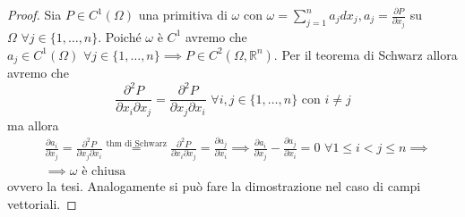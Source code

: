 \begin{proof}
Sia $P \in C^1(\Omega)$ una primitiva di $\omega$ con $\omega = \sum\limits_{j=1}^n a_j dx_j, a_j = \frac{\partial P}{\partial x_j}$ su $\Omega \, \, \forall j \in \{1, \ldots, n \}$. Poiché
$\omega$ è $C^1$ avremo che $a_j \in C^1(\Omega) \, \, \forall j \in \{1, \ldots, n \} \implies P \in C^2(\Omega, \mathbb{R}^n)$. Per il teorema di Schwarz allora avremo che
$$
\frac{\partial^2 P}{\partial x_i \partial x_j} = \frac{\partial^2 P}{\partial x_j \partial x_i} \, \, \forall i, j \in \{1, \ldots, n \} \text{ con } i \neq j
$$
ma allora
\begin{align*}
&\frac{\partial a_i}{\partial x_j} = \frac{\partial^2 P}{\partial x_j \partial x_i} \stackrel{\text{thm di Schwarz}}{=} \frac{\partial^2 P}{\partial x_i \partial x_j} = \frac{\partial a_j}{\partial x_i} \implies \frac{\partial a_i}{\partial x_j} - \frac{\partial a_j}{\partial x_i} = 0 \, \, \forall 1 \leq i < j \leq n \implies \\
&\implies \omega \text{ è chiusa }
\end{align*}
ovvero la tesi. Analogamente si può fare la dimostrazione nel caso di campi vettoriali.
\end{proof}
